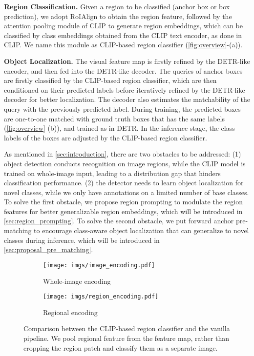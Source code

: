 \documentclass[10pt,twocolumn,letterpaper]{article}
\begin{document}
\noindent\textbf{Region Classification.}
Given a region to be classified (anchor box or box prediction), we adopt RoIAlign to obtain the region feature, followed by the attention pooling module of CLIP to generate region embeddings, which can be classified by class embeddings obtained from the CLIP text encoder, as done in CLIP.
We name this module as CLIP-based region classifier (\cref{fig:overview}-(a)).

\noindent\textbf{Object Localization.}
The visual feature map is firstly refined by the DETR-like encoder, and then fed into the DETR-like decoder.
The queries of anchor boxes are firstly classified by the CLIP-based region classifier, which are then conditioned on their predicted labels before iteratively refined by the DETR-like decoder for better localization. The decoder also estimates the matchability of the query with the previously predicted label.
During training, the predicted boxes are one-to-one matched with ground truth boxes that has the same labels (\cref{fig:overview}-(b)), and trained as in DETR.
In the inference stage, the class labels of the boxes are adjusted by the CLIP-based region classifier.

As mentioned in \cref{sec:introduction}, there are two obstacles to be addressed:
(1) object detection conducts recognition on image regions, while the CLIP model is trained on whole-image input, leading to a distribution gap that hinders classification performance.
(2) the detector needs to learn object localization for novel classes, while we only have annotations on a limited number of base classes. 
To solve the first obstacle, we propose region prompting to modulate the region features for better generalizable region embeddings, which will be introduced in \cref{sec:region_prompting}.
To solve the second obstacle, we put forward anchor pre-matching to encourage class-aware object localization that can generalize to novel classes during inference, which will be introduced in \cref{sec:proposal_pre_matching}.

\begin{figure}[t]
  \centering
  \begin{subfigure}{1.0\linewidth}
  \centering
    \texttt{[image: imgs/image\_encoding.pdf]}
    \caption{Whole-image encoding}
    \label{fig:whole_image}
  \end{subfigure}
  \hfill
  \begin{subfigure}{1.0\linewidth}
  \centering
    \texttt{[image: imgs/region\_encoding.pdf]}
    \caption{Regional encoding}
    \label{fig:regional}
  \end{subfigure}
\caption{Comparison between the CLIP-based region classifier and the vanilla pipeline. We pool regional feature from the feature map, rather than cropping the region patch and classify them as a separate image.}
   \label{fig:region}
\end{figure}
\end{document}
